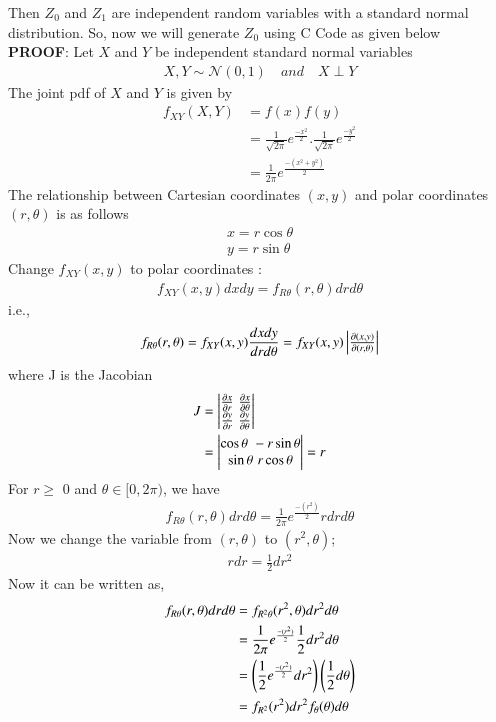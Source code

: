 \documentclass[article]{IEEEtran}
\theoremstyle{remark}
\begin{document}
  Then $Z_0$ and $Z_1$ are independent random variables with a standard normal distribution.
  So, now we will generate $Z_0$ using C Code as given below \\
\textbf{PROOF}:
  Let $X$ and $Y$ be independent standard normal variables 
  \begin{align}
  	X,Y \sim \mathcal{N}(0,1) \quad and \quad X\perp Y
  \end{align}
  The joint pdf of $X$ and $Y$ is given by 
  \begin{align}
  	f_{XY}(X,Y) &= f(x)f(y)\\
  	&= \frac{1}{\sqrt{2\pi}}e^{\frac{-x^2}{2}}.\frac{1}{\sqrt{2\pi}}e^{\frac{-y^2}{2}}\\
  	&= \frac{1}{2\pi}e^{\frac{-(x^2+y^2)}{2}}
  \end{align}
  The relationship between Cartesian coordinates $(x,y)$ and polar coordinates $(r,\theta)$ is as follows 
  \begin{align}
  	x=r\cos\theta \\
  	y=r\sin\theta
  \end{align}
  Change $f_{XY}(x,y)$ to polar coordinates :
  \begin{align}
  	f_{XY}(x,y) dxdy = f_{R\theta}(r,\theta) drd\theta
  \end{align}
  i.e.,
  \begin{align}
  	f_{R\theta}(r,\theta) = f_{XY}(x,y) \frac{dxdy}{drd\theta}
  	= f_{XY}(x,y) \begin{vmatrix}\frac{\partial(x,y)}{\partial(r,\theta)}\end{vmatrix}
  \end{align}
  where J is the Jacobian 
  \begin{align}
  	J &= \begin{vmatrix}\frac{\partial x}{\partial r} \,\, \frac{\partial x}{\partial \theta}\\\frac{\partial y}{\partial r} \,\, \frac{\partial y}{\partial \theta}\end{vmatrix}\\
  	&= \begin{vmatrix}\cos\theta \,\, -r\sin\theta \\ \sin\theta \,\, r\cos\theta\end{vmatrix} = r
  \end{align}
  For $r\ge$ 0 and $\theta \in [0,2\pi)$, we have 
  \begin{align}
  	f_{R\theta}(r,\theta) drd\theta = \frac{1}{2\pi}e^{\frac{-(r^2)}{2}}rdrd\theta
  \end{align}
  Now we change the variable from $(r,\theta)$ to $(r^2,\theta)$;
  \begin{align}
  	rdr = \frac{1}{2}dr^2
  \end{align}
  Now it can be written as, 
  \begin{align}
  	f_{R\theta}(r,\theta)drd\theta &= f_{R^2\theta}(r^2,\theta)dr^2d\theta\\
  	&= \frac{1}{2\pi}e^{\frac{-(r^2)}{2}}\frac{1}{2}dr^2d\theta\\
  	&= \left(\frac{1}{2}e^{\frac{-(r^2)}{2}}dr^2\right)\left(\frac{1}{2}d\theta\right)\\
  	&= f_{R^2}(r^2)dr^2 f_{\theta}(\theta)d\theta
  \end{align}
\end{document}
